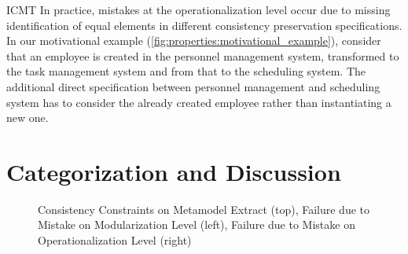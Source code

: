 \begin{copiedFrom}{ICMT}
In practice, mistakes at the operationalization level occur due to missing identification of equal elements in different consistency preservation specifications. 
In our motivational example (\autoref{fig:properties:motivational_example}), %
consider that an employee is created in the personnel management system, transformed to the task management system and from that to the scheduling system.
The additional direct specification between personnel management and scheduling system has to consider the already created employee rather than instantiating a new one.




\section{Categorization and Discussion}
\label{chap:errors:categorization}

\begin{figure}[tb]
    \centering
    
    \caption{Consistency Constraints on Metamodel Extract (top), Failure due to Mistake on Modularization Level (left), Failure due to Mistake on Operationalization Level (right)}
    \label{fig:correctness:mistake_effects_example}
\end{figure}


\end{copiedFrom}
